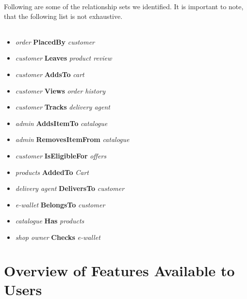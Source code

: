 \documentclass[12pt]{article}
\begin{document}
Following are some of the relationship sets we identified. It is important to note, that the following list is not exhaustive.
\\
\\
\begin{minipage}[t]{0.45\linewidth}
    \begin{itemize}
        \item \textit{order} \textbf{PlacedBy} \textit{customer}
        \item \textit{customer} \textbf{Leaves} \textit{product review}
        \item \textit{customer} \textbf{AddsTo} \textit{cart}
        \item \textit{customer} \textbf{Views} \textit{order history}
        \item \textit{customer} \textbf{Tracks} \textit{delivery agent}
        \item \textit{admin} \textbf{AddsItemTo} \textit{catalogue}
        \item \textit{admin} \textbf{RemovesItemFrom} \textit{catalogue}
    \end{itemize}
\end{minipage}
\hfill
\begin{minipage}[t]{0.45\linewidth}
    \begin{itemize}
        \item \textit{customer} \textbf{IsEligibleFor} \textit{offers}
        \item \textit{products} \textbf{AddedTo} \textit{Cart}
        \item \textit{delivery agent} \textbf{DeliversTo} \textit{customer}
        \item \textit{e-wallet} \textbf{BelongsTo} \textit{customer}
        \item \textit{catalogue} \textbf{Has} \textit{products}
        \item \textit{shop owner} \textbf{Checks} \textit{e-wallet}
        
    \end{itemize}
\end{minipage}

\newpage


\section*{Overview of Features Available to Users}
\end{document}
